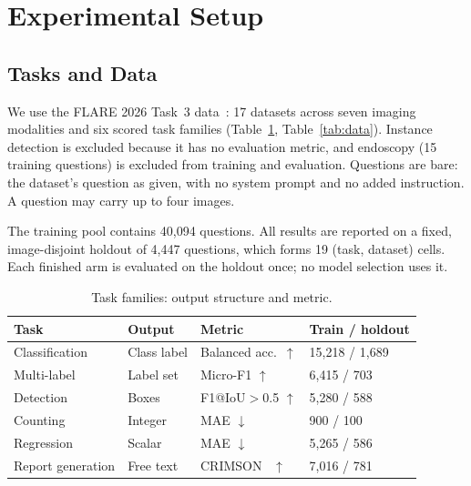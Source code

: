 \documentclass[journal,twoside,web]{ieeecolor}
\begin{document}
\section{Experimental Setup}
\label{sec:setup}

\subsection{Tasks and Data}

We use the FLARE 2026 Task~3 data~\cite{flare2026task3}: 17 datasets across
seven imaging modalities and six scored task families
(Table~\ref{tab:tasks}, Table~\ref{tab:data}). Instance detection is
excluded because it has no evaluation metric, and endoscopy (15 training
questions) is excluded from training and evaluation. Questions are bare: the
dataset's question as given, with no system prompt and no added
instruction. A question may carry up to four images.

The training pool contains 40{,}094 questions. All results are reported on a
fixed, image-disjoint holdout of 4{,}447 questions, which forms 19
(task, dataset) cells. Each finished arm is evaluated on the holdout once; no
model selection uses it.

\begin{table}[!t]
\caption{Task families: output structure and metric.}
\label{tab:tasks}
\centering
\setlength{\tabcolsep}{3pt}
\begin{tabular}{llll}
\toprule
Task & Output & Metric & Train / holdout \\
\midrule
Classification & Class label & Balanced acc.\ $\uparrow$ & 15{,}218 / 1{,}689 \\
Multi-label & Label set & Micro-F1 $\uparrow$ & 6{,}415 / 703 \\
Detection & Boxes & F1@IoU$>$0.5 $\uparrow$ & 5{,}280 / 588 \\
Counting & Integer & MAE $\downarrow$ & 900 / 100 \\
Regression & Scalar & MAE $\downarrow$ & 5{,}265 / 586 \\
Report generation & Free text & CRIMSON~\cite{baharoon2026crimson} $\uparrow$ & 7{,}016 / 781 \\
\bottomrule
\end{tabular}
\end{table}
\end{document}
